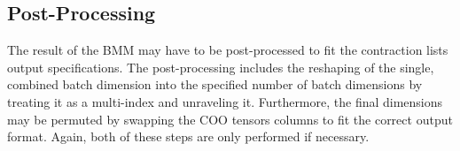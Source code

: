 \subsection{Post-Processing}
The result of the BMM may have to be post-processed to fit the contraction lists output
specifications. The post-processing includes the reshaping of the single, combined batch dimension
into the specified number of batch dimensions by treating it as a multi-index and unraveling it.
Furthermore, the final dimensions may be permuted by swapping the COO tensors columns to fit the
correct output format. Again, both of these steps are only performed if necessary.